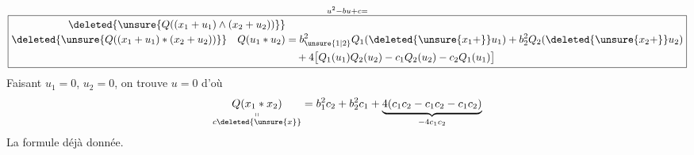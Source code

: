 \[
\overset{u^2-bu+c=}{\boxed{\begin{aligned}\deleted{\unsure{Q((x_1+u_1)\wedge(x_2+u_2))}}&\\[-2pt]\deleted{\unsure{Q((x_1+u_1)*(x_2+u_2))}}\quad Q(u_1*u_2)&=b_{\unsure{1|2}}^2Q_1(\deleted{\unsure{x_1+}}u_1)+b_2^2Q_2(\deleted{\unsure{x_2+}}u_2)\\ &\quad+4\big[Q_1(u_1)Q_2(u_2)-c_1Q_2(u_2)-c_2Q_1(u_1)\big]\end{aligned}}}
\]
Faisant $u_1=0$, $u_2=0$, on trouve $u=0$ d'où
\[
\underset{\substack{\shortparallel\\ c\deleted{\unsure{x}}}}{Q(x_1*x_2)}=b_1^2c_2+b_2^2c_1+\underbrace{4(c_1c_2-c_1c_2-c_1c_2)}_{-4c_1c_2}
\]
 La formule déjà donnée.
